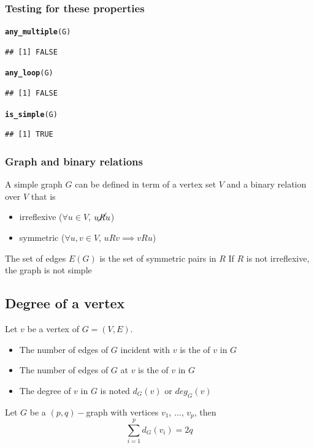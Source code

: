 \documentclass[aspectratio=169]{beamer}\usepackage[]{graphicx}\usepackage[]{xcolor}
\makeatletter
\newcommand{\hldef}[1]{\textcolor[rgb]{0.345,0.345,0.345}{#1}}%
\newcommand{\hlkwd}[1]{\textcolor[rgb]{0.737,0.353,0.396}{\textbf{#1}}}%
\newenvironment{kframe}{%
 \def\at@end@of@kframe{}%
 \ifinner\ifhmode%
  \def\at@end@of@kframe{\end{minipage}}%
  \begin{minipage}{\columnwidth}%
 \fi\fi%
 \def\FrameCommand##1{\hskip\@totalleftmargin \hskip-\fboxsep
 \colorbox{shadecolor}{##1}\hskip-\fboxsep
     \hskip-\linewidth \hskip-\@totalleftmargin \hskip\columnwidth}%
 \MakeFramed {\advance\hsize-\width
   \@totalleftmargin\z@ \linewidth\hsize
   \@setminipage}}%
 {\par\unskip\endMakeFramed%
 \at@end@of@kframe}
\newenvironment{knitrout}{}{} %
\makeatother
\begin{document}
\begin{frame}[fragile]\frametitle{Testing for these properties}
\begin{knitrout}
\color{fgcolor}\begin{kframe}
\begin{alltt}
\hlkwd{any_multiple}\hldef{(G)}
\end{alltt}
\begin{verbatim}
## [1] FALSE
\end{verbatim}
\begin{alltt}
\hlkwd{any_loop}\hldef{(G)}
\end{alltt}
\begin{verbatim}
## [1] FALSE
\end{verbatim}
\begin{alltt}
\hlkwd{is_simple}\hldef{(G)}
\end{alltt}
\begin{verbatim}
## [1] TRUE
\end{verbatim}
\end{kframe}
\end{knitrout}
\end{frame}



\begin{frame}\frametitle{Graph and binary relations}
A simple graph $G$ can be defined in term of a vertex set $V$ and a binary relation over $V$ that is
	\begin{itemize}
		\item irreflexive ($\forall u\in V$, $u\cancel Ru$)
		\item symmetric ($\forall u,v\in V$, $uRv\implies vRu$)
	\end{itemize}
	\vfill
	The set of edges $E(G)$ is the set of symmetric pairs in $R$
	\vfill
	If $R$ is not irreflexive, the graph is not simple
\end{frame}


\subsection{Degree of a vertex}

\begin{frame}
	\begin{definition}
	Let $v$ be a vertex of $G=(V,E)$.
	\begin{itemize}
	\item The number of edges of $G$ incident with $v$ is the  of $v$ in $G$
	\item The number of edges of $G$ at $v$ is the  of $v$ in $G$
	\item The degree of $v$ in $G$ is noted $d_G(v)$ or $deg_G(v)$
	\end{itemize}
	\end{definition}
	\vfill
	\begin{theorem}\label{th:sum-degrees}
	Let $G$ be a $(p,q)-$graph with vertices $v_1$, $\dots$, $v_p$, then
	\[
		\sum_{i=1}^{p}d_G(v_i)=2q
	\]
	\end{theorem}
\end{frame}
\end{document}
